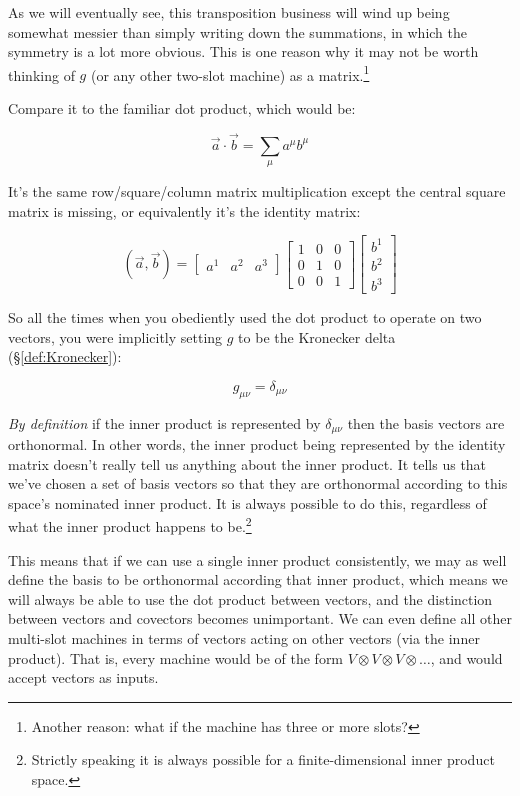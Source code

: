 As we will eventually see, this transposition business will wind up being somewhat messier than simply writing down the summations, in which the symmetry is a lot more obvious. This is one reason why it may not be worth thinking of $g$ (or any other two-slot machine) as a matrix.\footnote{Another reason: what if the machine has three or more slots?}

Compare it to the familiar dot product, which would be:

$$
\vec{a} \cdot \vec{b} = \sum_{\mu} a^\mu b^\mu
$$

It's the same row/square/column matrix multiplication except the central square matrix is missing, or equivalently it's the identity matrix:

$$
(\vec{a}, \vec{b}) =
\begin{bmatrix}
a^1 & a^2 & a^3
\end{bmatrix}
\begin{bmatrix}
1 & 0 & 0 \\
0 & 1 & 0 \\
0 & 0 & 1
\end{bmatrix}
\begin{bmatrix}
b^1 \\ b^2 \\ b^3
\end{bmatrix}
$$

So all the times when you obediently used the dot product to operate on two vectors, you were implicitly setting $g$ to be the Kronecker delta (§\ref{def:Kronecker}):

$$
g_{\mu\nu} = \delta_{\mu\nu}
$$

\textit{By definition} if the inner product is represented by $\delta_{\mu\nu}$ then the basis vectors are orthonormal. In other words, the inner product being represented by the identity matrix doesn't really tell us anything about the inner product. It tells us that we've chosen a set of basis vectors so that they are orthonormal according to this space's nominated inner product. It is always possible to do this, regardless of what the inner product happens to be.\footnote{Strictly speaking it is always possible for a finite-dimensional inner product space.}

This means that if we can use a single inner product consistently, we may as well define the basis to be orthonormal according that inner product, which means we will always be able to use the dot product between vectors, and the distinction between vectors and covectors becomes unimportant. We can even define all other multi-slot machines in terms of vectors acting on other vectors (via the inner product). That is, every machine would be of the form $V \otimes V \otimes V \otimes \ldots$, and would accept vectors as inputs.

